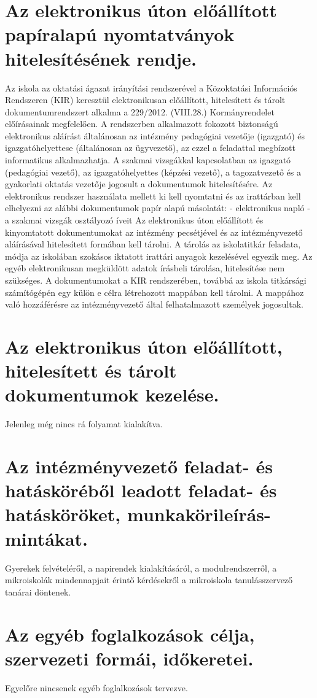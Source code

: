 \section{Az elektronikus úton előállított papíralapú nyomtatványok hitelesítésének rendje.}
Az iskola az oktatási ágazat irányítási rendszerével a Közoktatási Információs Rendszeren (KIR) keresztül elektronikusan előállított, hitelesített és tárolt dokumentumrendszert alkalma a 229/2012. (VIII.28.) Kormányrendelet előírásainak megfelelően. A rendszerben alkalmazott fokozott biztonságú elektronikus aláírást általánosan az intézmény pedagógiai vezetője (igazgató) és igazgatóhelyettese (általánosan az ügyvezető), az ezzel a feladattal megbízott informatikus alkalmazhatja. A szakmai vizsgákkal kapcsolatban az igazgató (pedagógiai vezető), az igazgatóhelyettes (képzési vezető), a tagozatvezető és a gyakorlati oktatás vezetője jogosult a dokumentumok hitelesítésére. Az elektronikus rendszer használata mellett ki kell nyomtatni és az irattárban kell elhelyezni az alábbi dokumentumok papír alapú másolatát: - elektronikus napló - a szakmai vizsgák osztályozó íveit Az elektronikus úton előállított és kinyomtatott dokumentumokat az intézmény pecsétjével és az intézményvezető aláírásával hitelesített formában kell tárolni. A tárolás az iskolatitkár feladata, módja az iskolában szokásos iktatott irattári anyagok kezelésével egyezik meg. Az egyéb elektronikusan megküldött adatok írásbeli tárolása, hitelesítése nem szükséges. A dokumentumokat a KIR rendszerében, továbbá az iskola titkársági számítógépén egy külön e célra létrehozott mappában kell tárolni. A mappához való hozzáférésre az intézményvezető által felhatalmazott személyek jogosultak. 


\section{Az elektronikus úton előállított, hitelesített és tárolt dokumentumok kezelése.}
Jelenleg még nincs rá folyamat kialakítva.

\section{Az intézményvezető feladat- és hatásköréből leadott feladat- és hatásköröket, munkakörileírás-mintákat.}
Gyerekek felvételéről, a napirendek kialakításáról, a modulrendszerről, a mikroiskolák mindennapjait érintő kérdésekről a mikroiskola tanulásszervező tanárai döntenek.

\section{Az egyéb foglalkozások célja, szervezeti formái, időkeretei.}
Egyelőre nincsenek egyéb foglalkozások tervezve.

